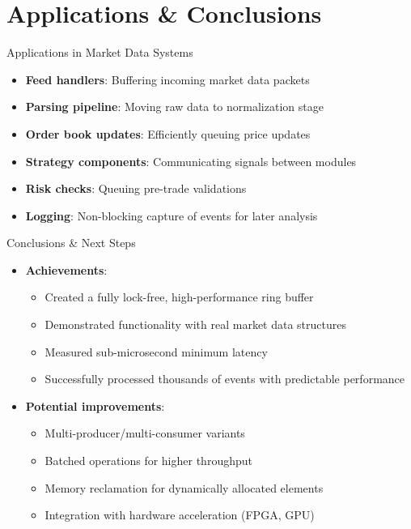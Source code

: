 \documentclass{beamer}
\begin{document}
\section{Applications \& Conclusions}

\begin{frame}{Applications in Market Data Systems}
\begin{itemize}
    \item \textbf{Feed handlers}: Buffering incoming market data packets
    \item \textbf{Parsing pipeline}: Moving raw data to normalization stage
    \item \textbf{Order book updates}: Efficiently queuing price updates
    \item \textbf{Strategy components}: Communicating signals between modules
    \item \textbf{Risk checks}: Queuing pre-trade validations
    \item \textbf{Logging}: Non-blocking capture of events for later analysis
\end{itemize}
\end{frame}

\begin{frame}{Conclusions \& Next Steps}
\begin{itemize}
    \item \textbf{Achievements}:
    \begin{itemize}
        \item Created a fully lock-free, high-performance ring buffer
        \item Demonstrated functionality with real market data structures
        \item Measured sub-microsecond minimum latency
        \item Successfully processed thousands of events with predictable performance
    \end{itemize}
    \item \textbf{Potential improvements}:
    \begin{itemize}
        \item Multi-producer/multi-consumer variants
        \item Batched operations for higher throughput
        \item Memory reclamation for dynamically allocated elements
        \item Integration with hardware acceleration (FPGA, GPU)
    \end{itemize}
\end{itemize}
\end{frame}
\end{document}
